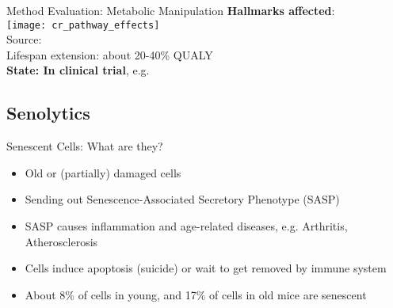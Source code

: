 

\begin{frame}[c]{Method Evaluation: Metabolic Manipulation}
    \textbf{Hallmarks affected}: \\
    \texttt{[image: cr\_pathway\_effects]} \\
    Source: \cite{erbaba2020effects} \\
    \pause
    Lifespan extension: about 20-40\% QUALY \cite{swindell2012dietary} \\
    \pause
    \textbf{State: In clinical trial}, e.g. \cite{TAMETarg47:online}
\end{frame}


\subsection{Senolytics}

\begin{frame}[c]{Senescent Cells: What are they?}
    \large
    \begin{itemize}[<+(1)->]
        \item Old or (partially) damaged cells
        \item Sending out Senescence-Associated Secretory Phenotype (SASP)
        \item SASP causes inflammation and age-related diseases, e.g. Arthritis, Atherosclerosis
        \item Cells induce apoptosis (suicide) or wait to get removed by immune system
        \item About 8\% of cells in young, and 17\% of cells in old mice are senescent \cite{folgueras2018mouse}
    \end{itemize}
\end{frame}

